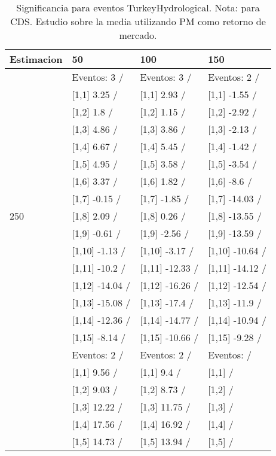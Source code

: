 \begin{table}

\caption{Significancia para eventos TurkeyHydrological. Nota: para CDS. Estudio sobre la media utilizando PM como retorno de mercado.}
\centering
\begin{tabular}[t]{llll}
\toprule
Estimacion & 50 & 100 & 150\\
\midrule
 & Eventos:  3 / & Eventos:  3 / & Eventos:  2 /\\
 & {}[1,1] 3.25  / & {}[1,1] 2.93  / & {}[1,1] -1.55  /\\
 & {}[1,2] 1.8  / & {}[1,2] 1.15  / & {}[1,2] -2.92  /\\
 & {}[1,3] 4.86  / & {}[1,3] 3.86  / & {}[1,3] -2.13  /\\
 & {}[1,4] 6.67  / & {}[1,4] 5.45  / & {}[1,4] -1.42  /\\
\addlinespace
 & {}[1,5] 4.95  / & {}[1,5] 3.58  / & {}[1,5] -3.54  /\\
 & {}[1,6] 3.37  / & {}[1,6] 1.82  / & {}[1,6] -8.6  /\\
 & {}[1,7] -0.15  / & {}[1,7] -1.85  / & {}[1,7] -14.03  /\\
250 & {}[1,8] 2.09  / & {}[1,8] 0.26  / & {}[1,8] -13.55  /\\
 & {}[1,9] -0.61  / & {}[1,9] -2.56  / & {}[1,9] -13.59  /\\
\addlinespace
 & {}[1,10] -1.13  / & {}[1,10] -3.17  / & {}[1,10] -10.64  /\\
 & {}[1,11] -10.2  / & {}[1,11] -12.33  / & {}[1,11] -14.12  /\\
 & {}[1,12] -14.04  / & {}[1,12] -16.26  / & {}[1,12] -12.54  /\\
 & {}[1,13] -15.08  / & {}[1,13] -17.4  / & {}[1,13] -11.9  /\\
 & {}[1,14] -12.36  / & {}[1,14] -14.77  / & {}[1,14] -10.94  /\\
\addlinespace
 & {}[1,15] -8.14  / & {}[1,15] -10.66  / & {}[1,15] -9.28  /\\
 & Eventos:  2 / & Eventos:  2 / & Eventos:   /\\
 & {}[1,1] 9.56  / & {}[1,1] 9.4  / & {}[1,1]  /\\
 & {}[1,2] 9.03  / & {}[1,2] 8.73  / & {}[1,2]  /\\
 & {}[1,3] 12.22  / & {}[1,3] 11.75  / & {}[1,3]  /\\
\addlinespace
 & {}[1,4] 17.56  / & {}[1,4] 16.92  / & {}[1,4]  /\\
 & {}[1,5] 14.73  / & {}[1,5] 13.94  / & {}[1,5]  /\\

\end{tabular}
\end{table}
